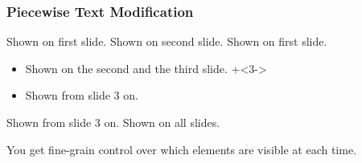 \documentclass{beamer}
\begin{document}
\begin{frame}
  \frametitle{Piecewise Text Modification}

    Shown on first slide.
    Shown on second slide.
    Shown on first slide.
    \begin{itemize}
        \item Shown on the second and the third slide.
  \onslide+<3->
        \item Shown from slide 3 on.
    \end{itemize}
    Shown from slide 3 on.
  \onslide
    Shown on all slides.

    \alert<4>{You get fine-grain control over which elements are visible at each time.}

\end{frame}
\end{document}
